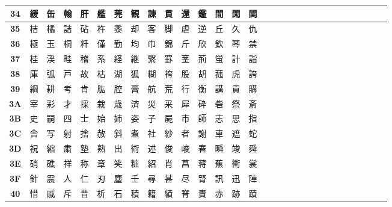 \begin{table}[H]
\begin{tabular}{|Sc|Sc|Sc|Sc|Sc|Sc|Sc|Sc|Sc|Sc|Sc|Sc|Sc|Sc|Sc|}
\textbf{34} & 緩 & 缶 & 翰 & 肝 & 艦 & 莞 & 観 & 諌 & 貫 & 還 & 鑑 & 間 & 閑 & 関 \\ \hline
\textbf{35} & 桔 & 橘 & 詰 & 砧 & 杵 & 黍 & 却 & 客 & 脚 & 虐 & 逆 & 丘 & 久 & 仇 \\ \hline
\textbf{36} & 極 & 玉 & 桐 & 粁 & 僅 & 勤 & 均 & 巾 & 錦 & 斤 & 欣 & 欽 & 琴 & 禁 \\ \hline
\textbf{37} & 桂 & 渓 & 畦 & 稽 & 系 & 経 & 継 & 繋 & 罫 & 茎 & 荊 & 蛍 & 計 & 詣 \\ \hline
\textbf{38} & 庫 & 弧 & 戸 & 故 & 枯 & 湖 & 狐 & 糊 & 袴 & 股 & 胡 & 菰 & 虎 & 誇 \\ \hline
\textbf{39} & 綱 & 耕 & 考 & 肯 & 肱 & 腔 & 膏 & 航 & 荒 & 行 & 衡 & 講 & 貢 & 購 \\ \hline
\textbf{3A} & 宰 & 彩 & 才 & 採 & 栽 & 歳 & 済 & 災 & 采 & 犀 & 砕 & 砦 & 祭 & 斎 \\ \hline
\textbf{3B} & 史 & 嗣 & 四 & 士 & 始 & 姉 & 姿 & 子 & 屍 & 市 & 師 & 志 & 思 & 指 \\ \hline
\textbf{3C} & 舎 & 写 & 射 & 捨 & 赦 & 斜 & 煮 & 社 & 紗 & 者 & 謝 & 車 & 遮 & 蛇 \\ \hline
\textbf{3D} & 祝 & 縮 & 粛 & 塾 & 熟 & 出 & 術 & 述 & 俊 & 峻 & 春 & 瞬 & 竣 & 舜 \\ \hline
\textbf{3E} & 硝 & 礁 & 祥 & 称 & 章 & 笑 & 粧 & 紹 & 肖 & 菖 & 蒋 & 蕉 & 衝 & 裳 \\ \hline
\textbf{3F} & 針 & 震 & 人 & 仁 & 刃 & 塵 & 壬 & 尋 & 甚 & 尽 & 腎 & 訊 & 迅 & 陣 \\ \hline
\textbf{40} & 惜 & 戚 & 斥 & 昔 & 析 & 石 & 積 & 籍 & 績 & 脊 & 責 & 赤 & 跡 & 蹟 \\ \hline
\end{tabular}
\end{table}

